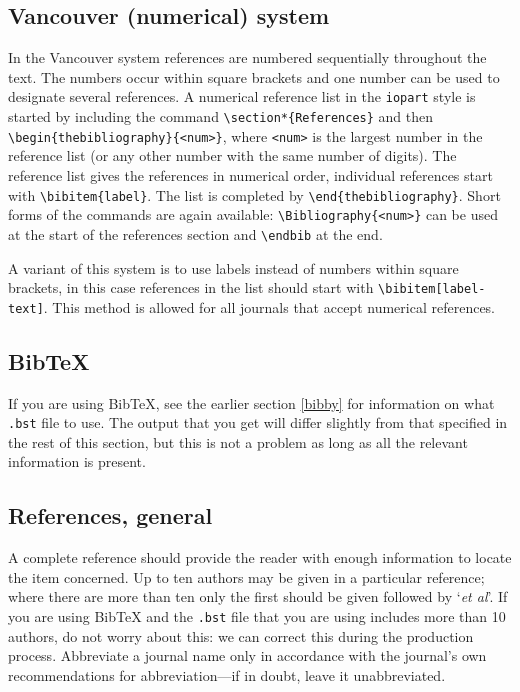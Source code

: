 \documentclass[12pt]{iopart}
\begin{document}
\subsection{Vancouver (numerical) system}
In the Vancouver system references are numbered sequentially 
throughout the text. The numbers occur within square brackets and one 
number can be used to designate several references. A numerical 
reference list in the \verb"iopart" style is started by including the 
command \verb"\section*{References}" and then
\verb"\begin{thebibliography}{<num>}", where \verb"<num>" is the largest
number in the reference list (or any other number with the same number
of digits).  The 
reference list gives the references in 
numerical order, individual references start with \verb"\bibitem{label}". The list is completed by
\verb"\end{thebibliography}". Short forms of the commands are again
available: \verb"\Bibliography{<num>}" can be used at the start of the
references section and \verb"\endbib" at the end.

A variant of this system is to use labels instead of numbers within 
square brackets, in this case references in the list should start with \verb"\bibitem[label-text]". This method is allowed for all journals that accept numerical references.

\subsection{BibTeX\label{bibtex}}
If you are using BibTeX, see the earlier section \ref{bibby} for information on what \verb".bst" file to use.
The output that you get will differ slightly from that specified in the rest of this section,
but this is not a problem as long as all the relevant information is present.

\subsection{References, general}
A complete reference should provide the reader with enough information to 
locate the item concerned. Up to ten authors may be given in a particular reference; where 
there are more than ten only the first should be given followed by 
`{\it et al}'.  If you are using BibTeX
and the \verb".bst" file that you are using includes more than 10 authors, do not worry about this:
we can correct this during the production process.  Abbreviate a journal name only in accordance with the journal's
own recommendations for abbreviation---if in doubt, leave it unabbreviated.
\end{document}
